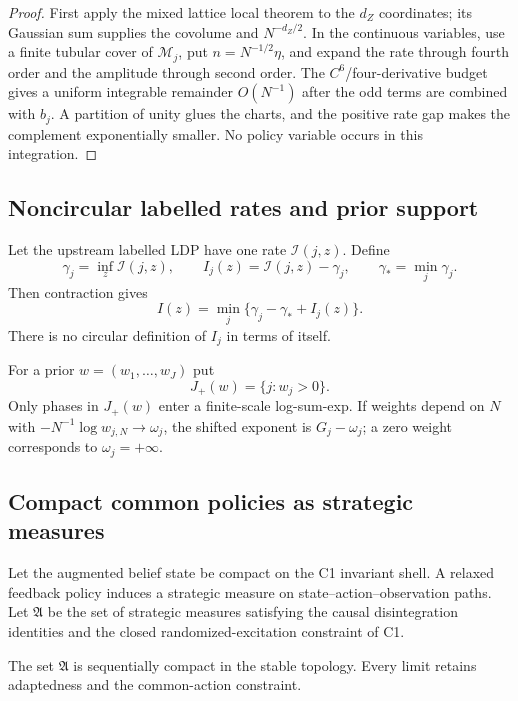 \begin{proof}
First apply the mixed lattice local theorem to the $d_Z$ coordinates; its
Gaussian sum supplies the covolume and $N^{-d_Z/2}$.  In the continuous
variables, use a finite tubular cover of $\mathcal M_j$, put
$n=N^{-1/2}\eta$, and expand the rate through fourth order and the amplitude
through second order.  The $C^6$/four-derivative budget gives a uniform
integrable remainder $O(N^{-1})$ after the odd terms are combined with
$b_j$.  A partition of unity glues the charts, and the positive rate gap makes
the complement exponentially smaller.  No policy variable occurs in this
integration.
\end{proof}

\subsection{Noncircular labelled rates and prior support}

Let the upstream labelled LDP have one rate
$\mathcal I(j,z)$.  Define
\[
 \gamma_j=\inf_z\mathcal I(j,z),\qquad
 I_j(z)=\mathcal I(j,z)-\gamma_j,\qquad
 \gamma_*=\min_j\gamma_j.                                \tag{D1.6}
\]
Then contraction gives
\[
 I(z)=\min_j\{\gamma_j-\gamma_*+I_j(z)\}.                  \tag{D1.7}
\]
There is no circular definition of $I_j$ in terms of itself.

For a prior $w=(w_1,\ldots,w_J)$ put
\[
 J_+(w)=\{j:w_j>0\}.                                      \tag{D1.8}
\]
Only phases in $J_+(w)$ enter a finite-scale log-sum-exp.  If weights depend on
$N$ with
$-N^{-1}\log w_{j,N}\to\omega_j$, the shifted exponent is
$G_j-\omega_j$; a zero weight corresponds to $\omega_j=+\infty$.

\subsection{Compact common policies as strategic measures}

Let the augmented belief state be compact on the C1 invariant shell.  A
relaxed feedback policy induces a strategic measure on state--action--observation
paths.  Let $\mathfrak A$ be the set of strategic measures satisfying the
causal disintegration identities and the closed randomized-excitation
constraint of C1.

\begin{lemma}
\label{lem:r29-d1-policy}
The set $\mathfrak A$ is sequentially compact in the stable topology.  Every
limit retains adaptedness and the common-action constraint.
\end{lemma}


